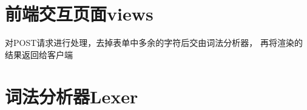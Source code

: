 \documentclass[letterpaper,10pt,english]{sphinxmanual}
\begin{document}
\section{前端交互页面views}
\label{\detokenize{lexer/views::doc}}\label{\detokenize{lexer/views:module-lexer.views}}\label{\detokenize{lexer/views:views}}

\begin{fulllineitems}
\label{\detokenize{lexer/views:lexer.views.complie}}
对POST请求进行处理，去掉表单中多余的字符后交由词法分析器，
再将渲染的结果返回给客户端

\end{fulllineitems}



\section{词法分析器Lexer}
\label{\detokenize{lexer/lexer::doc}}\label{\detokenize{lexer/lexer:lexer}}
\end{document}
